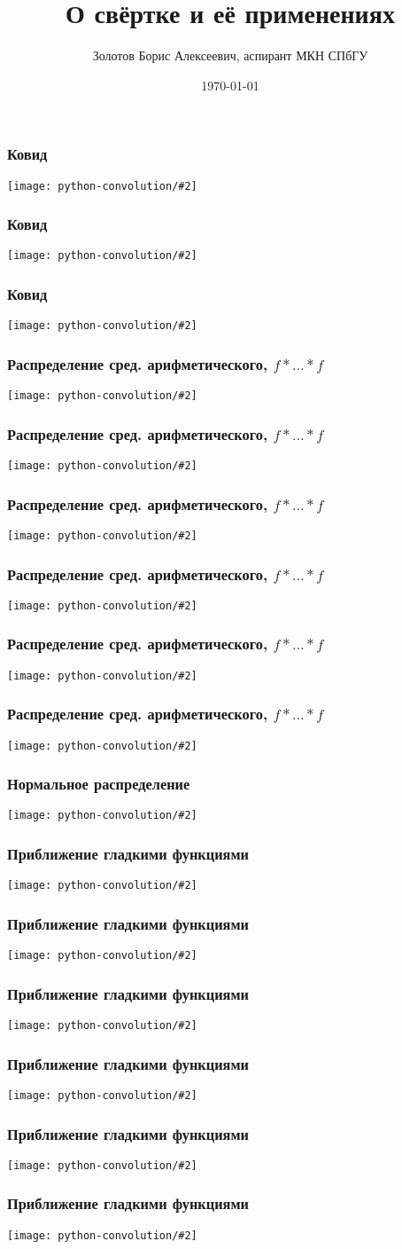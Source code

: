 \documentclass[11pt,aspectratio=169,svgnames]{beamer}
\title{О свёртке и её применениях}
\date{\today}
\author{Золотов Борис Алексеевич, аспирант МКН СПбГУ}
\institute{«Лига Лекторов», 3 сезон}
\newcommand{\graslide}[2]{
   \begin{frame} \frametitle{#1}
      \texttt{[image: python-convolution/\#2]}
   \end{frame}
}
\newcommand{\probtitle}{Распределение сред. арифметического, \(f * \ldots * f\)}
\begin{document}
 \maketitle

\graslide{Ковид}{covid-0}
\graslide{Ковид}{covid-1}
\graslide{Ковид}{covid-2}


\graslide{\probtitle}{probability-0}
\graslide{\probtitle}{probability-1}
\graslide{\probtitle}{probability-2}
\graslide{\probtitle}{probability-3}
\graslide{\probtitle}{probability-4}
\graslide{\probtitle}{probability-5}


\graslide{Нормальное распределение}{normal}
\graslide{Приближение гладкими функциями}{smoothing-0}
\graslide{Приближение гладкими функциями}{smoothing-2.00}
\graslide{Приближение гладкими функциями}{smoothing-1.00}
\graslide{Приближение гладкими функциями}{smoothing-0.50}
\graslide{Приближение гладкими функциями}{smoothing-0.20}
\graslide{Приближение гладкими функциями}{smoothing-0.05}
\end{document}
